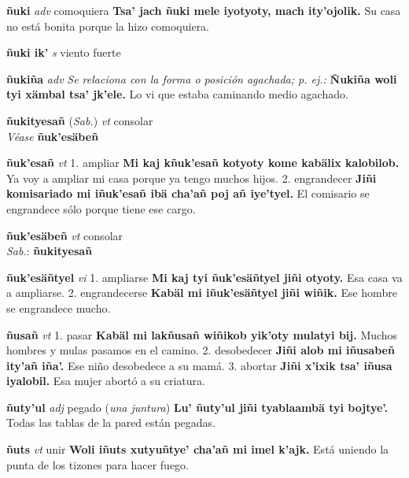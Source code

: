 \documentclass[10pt]{scrbook}
\newcommand{\entry}[1]{\textbf{#1}}
\newcommand{\onedefinition}[1]{#1.}
\newcommand{\nontranslationdef}[1]{\textit{#1}}
\newcommand{\partofspeech}[1]{\textit{#1}}
\newcommand{\spanishtranslation}[1]{#1}
\newcommand{\clarification}[1]{(\textit{#1})}
\newcommand{\cholexample}[1]{\textbf{#1}}
\newcommand{\exampletranslation}[1]{#1}
\newcommand{\dialectvariant}[1]{\\\textit{#1}:}
\newcommand{\dialectword}[1]{\textbf{#1}}
\newcommand{\alsosee}[1]{\\\textit{Véase} \textbf{#1}}
\newcommand{\relevantdialect}[1]{(\textit{#1})}
\begin{document}
\begin{multicols}{2}
\entry{ñuki}
\partofspeech{adv}
\spanishtranslation{comoquiera}
\cholexample{Tsa' jach ñuki mele iyotyoty, mach ity'ojolik.}
\exampletranslation{Su casa no está bonita porque la hizo comoquiera.}

\entry{ñuki ik'}
\partofspeech{s}
\spanishtranslation{viento fuerte}

\entry{ñukiña}
\partofspeech{adv}
\nontranslationdef{Se relaciona con la forma o posición agachada; p. ej.:}
\cholexample{Ñukiña woli tyi xämbal tsa' jk'ele.}
\exampletranslation{Lo vi que estaba caminando medio agachado.}

\entry{ñukityesañ}
\relevantdialect{Sab.}
\partofspeech{vt}
\spanishtranslation{consolar}
\alsosee{ñuk'esäbeñ}

\entry{ñuk'esañ}
\partofspeech{vt}
\onedefinition{1}
\spanishtranslation{ampliar}
\cholexample{Mi kaj kñuk'esañ kotyoty kome kabälix kalobilob.}
\exampletranslation{Ya voy a ampliar mi casa porque ya tengo muchos hijos.}
\onedefinition{2}
\spanishtranslation{engrandecer}
\cholexample{Jiñi komisariado mi iñuk'esañ ibä cha'añ poj añ iye'tyel.}
\exampletranslation{El comisario se engrandece sólo porque tiene ese cargo.}

\entry{ñuk'esäbeñ}
\partofspeech{vt}
\spanishtranslation{consolar}
\dialectvariant{Sab.}
\dialectword{ñukityesañ}

\entry{ñuk'esäñtyel}
\partofspeech{vi}
\onedefinition{1}
\spanishtranslation{ampliarse}
\cholexample{Mi kaj tyi ñuk'esäñtyel jiñi otyoty.}
\exampletranslation{Esa casa va a ampliarse.}
\onedefinition{2}
\spanishtranslation{engrandecerse}
\cholexample{Kabäl mi iñuk'esäñtyel jiñi wiñik.}
\exampletranslation{Ese hombre se engrandece mucho.}

\entry{ñusañ}
\partofspeech{vt}
\onedefinition{1}
\spanishtranslation{pasar}
\cholexample{Kabäl mi lakñusañ wiñikob yik'oty mulatyi bij.}
\exampletranslation{Muchos hombres y mulas pasamos en el camino.}
\onedefinition{2}
\spanishtranslation{desobedecer}
\cholexample{Jiñi alob mi iñusabeñ ity'añ iña'.}
\exampletranslation{Ese niño desobedece a su mamá.}
\onedefinition{3}
\spanishtranslation{abortar}
\cholexample{Jiñi x'ixik tsa' iñusa iyalobil.}
\exampletranslation{Esa mujer abortó a su criatura.}

\entry{ñuty'ul}
\partofspeech{adj}
\spanishtranslation{pegado}
\clarification{una juntura}
\cholexample{Lu' ñuty'ul jiñi tyablaambä tyi bojtye'.}
\exampletranslation{Todas las tablas de la pared están pegadas.}

\entry{ñuts}
\partofspeech{vt}
\spanishtranslation{unir}
\cholexample{Woli iñuts xutyuñtye' cha'añ mi imel k'ajk.}
\exampletranslation{Está uniendo la punta de los tizones para hacer fuego.}


\end{multicols}
\end{document}
